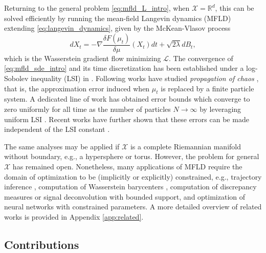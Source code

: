 \documentclass{article}
\begin{document}
Returning to the general problem \eqref{eq:mfld_L_intro}, when $\mathcal{X}=\mathbb{R}^d$, this can be solved efficiently by running the mean-field Langevin dynamics (MFLD) \citep{nitanda2022convex,chizat2022meanfield} extending \eqref{eq:langevin_dynamics}, given by the McKean-Vlasov process
\begin{equation}\label{eq:mfld_sde_intro}
    dX_t = -\nabla \frac{\delta F(\mu_t)}{\delta\mu}(X_t)dt + \sqrt{2\lambda}dB_t,
\end{equation}
which is the Wasserstein gradient flow minimizing $\mathcal{L}$. The convergence of \eqref{eq:mfld_sde_intro} and its time discretization has been established under a log-Sobolev inequality (LSI) in \citep{nitanda2022convex}. Following works have studied \emph{propagation of chaos} \citep{sznitman1991}, that is, the approximation error induced when $\mu_t$ is replaced by a finite particle system. A dedicated line of work has obtained error bounds which converge to zero uniformly for all time as the number of particles $N\to\infty$ by leveraging uniform LSI \citep{chen2023uniform,suzuki2023uniformintime,suzuki2023meanfield}. Recent works have further shown that these errors can be made independent of the LSI constant \citep{nitanda2024improved,chewi2024uniform,nitanda2025}.

The same analyses may be applied if $\mathcal{X}$ is a complete Riemannian manifold without boundary, e.g., a hypersphere or torus. However, the problem for general $\mathcal{X}$ has remained open. Nonetheless, many applications of MFLD require the domain of optimization to be (implicitly or explicitly) constrained, e.g., trajectory inference \citep{chizat2022trajectoryinferencemeanfieldlangevin,gu2025partially,gu2025private}, computation of Wasserstein barycenters \citep{chizat2023doublyregularizedentropicwasserstein,vaskevicius2023barycenter}, computation of discrepancy measures \citep{suzuki2023meanfield} or signal deconvolution \citep{chizat2018global} with bounded support, and optimization of neural networks \citep{nitanda2022convex,nitanda2025} with constrained parameters. A more detailed overview of related works is provided in Appendix \ref{app:related}.

\subsection{Contributions}

\end{document}
